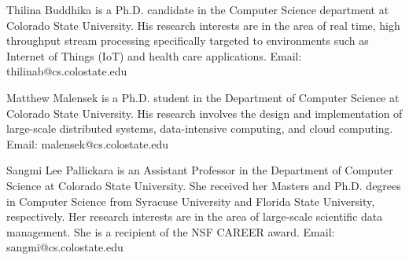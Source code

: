 \documentclass[9pt,journal,compsoc]{IEEEtran}
\begin{document}


\vspace*{-3.7\baselineskip}
\begin{IEEEbiography}{Thilina Buddhika} is a Ph.D. candidate in the Computer Science department at Colorado State University.  His research interests are in the area of real time, high throughput stream processing specifically targeted to environments such as Internet of Things (IoT) and health care applications. Email: thilinab@cs.colostate.edu
\end{IEEEbiography}
\vspace{-1.60cm}
\begin{IEEEbiography}{Matthew Malensek} is a Ph.D. student in the Department of Computer Science at Colorado State University. His research involves the design and implementation of large-scale distributed systems, data-intensive computing, and cloud computing. Email: malensek@cs.colostate.edu
\end{IEEEbiography}
%
\vspace{-1.60cm}
\begin{IEEEbiography}{Sangmi Lee Pallickara} is an Assistant Professor in the Department of Computer Science at Colorado State University. She received her Masters and Ph.D. degrees in Computer Science from Syracuse University and Florida State University, respectively. Her research interests are in the area of large-scale scientific data management. She is a recipient of the NSF CAREER award. Email: sangmi@cs.colostate.edu
\end{IEEEbiography}
\end{document}

